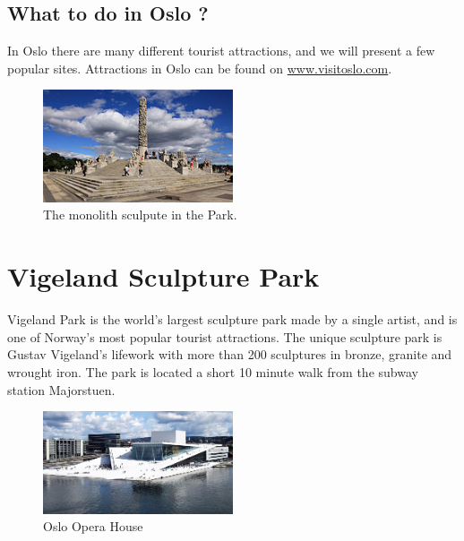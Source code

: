 \documentclass{article}
\begin{document}
\clearpage
\begin{center}


\section*{What to do in Oslo ?}
In Oslo there are many different tourist attractions, and we will present a few  popular sites. Attractions in Oslo can be found on \href{www.visitoslo.com}{www.visitoslo.com}.


\end{center}
\begin{figure}
    \centering
    \captionsetup{width=0.4\textwidth}
    \includegraphics[width=0.5\textwidth]{img/Vigelansparken.jpg}%
     \caption{The monolith sculpute in the Park.}
\end{figure}

\section*{Vigeland Sculpture Park}

Vigeland Park is the world's largest sculpture park made by a single artist, and is one of Norway's most popular tourist attractions. The unique sculpture park is Gustav Vigeland's lifework with more than 200 sculptures in bronze, granite and wrought iron. The park is located a short 10 minute walk from the subway station Majorstuen.

\begin{figure}
    \centering
    \includegraphics[width=0.5\textwidth]{img/operahouse.jpg}%
     \caption{Oslo Opera House }
\end{figure}
\end{document}
